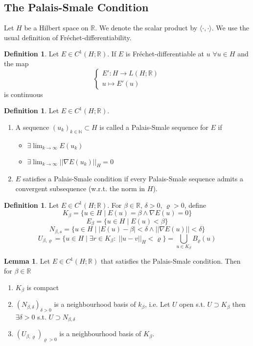 \documentclass[a4paper, 12pt]{article}
\theoremstyle{plain}
\theoremstyle{definition}
\newtheorem{definition}[theorem]{Definition} %
\theoremstyle{lemma}
\newtheorem{lemma}[theorem]{Lemma}
\theoremstyle{remark}
\theoremstyle{corollary}
\theoremstyle{example}
\begin{document}
	\subsection{The Palais-Smale Condition}
	Let $H$ be a Hilbert space on $\mathbb{R}$. We denote the scalar product by $\langle \cdot , \cdot \rangle$. We use the usual definition of Fréchet-differentiability.
	\begin{definition}
		Let $E \in C^1(H;\mathbb{R})$. If $E$ is  Fréchet-differentiable at $u$ $\forall u \in H$ and the map \[\begin{cases}
			E': H \to L(H; \mathbb{R})\\
			u \mapsto E'(u)
		\end{cases}\]
	is continuous 
	\end{definition}	
	\begin{definition}
		Let $E \in C^1(H;\mathbb{R})$. \begin{enumerate}
			\item A sequence $(u_k)_{k \in \mathbb{N}} \subset H$ is called a Palais-Smale sequence for $E$ if \begin{itemize}
				\item $\exists \lim_{k \to \infty} E(u_k)$
				\item $\exists \lim_{k \to \infty} \left|\left|\nabla E(u_k)\right|\right|_H = 0$ 
			\end{itemize}
		\item $E$ satisfies a Palais-Smale condition if every Palais-Smale sequence admits a convergent subsequence (w.r.t. the norm in $H$).
		\end{enumerate}
	\end{definition}
	\begin{definition}
		Let $E \in C^1(H;\mathbb{R})$. For $\beta \in \mathbb{R}$, $\delta > 0$, $\varrho > 0$, define \[K_\beta = \{u \in H \mid E(u) = \beta \land \nabla E(u) = 0\}\]
		\[E_\beta = \{u \in H \mid E(u) < \beta\}\]
		\[N_{\beta, s} = \{u \in H \mid \left|E(u) - \beta\right| < \delta \land \left|\left|\nabla E(u)\right|\right| < \delta\}\]
		\[U_{\beta, \varrho} = \{u \in H \mid \exists r \in K_\beta : \; \left|\left|u-v\right|\right|_H < \varrho\} = \bigcup_{u \in K_\beta} B_\varrho(u)\]
	\end{definition}
	\begin{lemma}
		Let $E \in C^1(H;\mathbb{R})$ that satisfies the Palais-Smale condition. Then for $\beta \in \mathbb{R}$ \begin{enumerate}
			\item $K_\beta$ is compact
			\item $(N_{\beta,\delta})_{\delta > 0}$ is a neighbourhood basis of $k_\beta$, i.e. Let $U$ open s.t. $U\supset K_\beta$ then $\exists \delta > 0$ s.t. $U\supset N_{\beta, \delta}$
			\item $(U_{\beta, \varrho})_{\varrho > 0}$ is a neighbourhood basis of $K_\beta$.
		\end{enumerate}
	\end{lemma}
\end{document}

